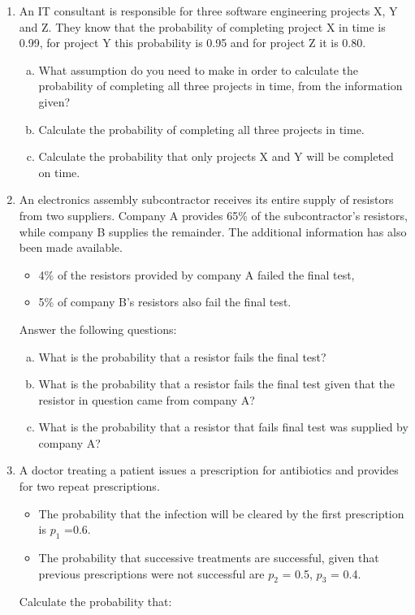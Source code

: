 \documentclass[a4paper,12pt]{article}
\begin{document}
\begin{enumerate}
\item An IT consultant is responsible for three software engineering projects X, Y and Z.
They know that the probability of completing project X in time is 0.99, for project Y this probability is 0.95
and for project Z it is 0.80.

\begin{enumerate}[(a)]
\item What assumption do you need to make in order to calculate the probability
of completing all three projects in time, from the information given?
\item Calculate the probability of completing all three projects in time.
\item Calculate the probability that only projects X and Y will be completed on time.
\end{enumerate}

    \item 
An electronics assembly subcontractor receives its entire supply of resistors from two suppliers. Company A provides 65\% of the subcontractor's resistors, while company B supplies the remainder. The additional information has also been made available.
\begin{itemize}
\item 4\% of the resistors provided by company A failed the final test,
\item 5\% of company B's resistors also fail the final test.
\end{itemize}
\noindent Answer the following questions:
\begin{enumerate}[(a)]
\item What is the probability that a resistor fails the final test?
\item  What is the probability that a resistor fails the final test given that the resistor in question came from company A?
\item  What is the probability that a resistor that fails final test was supplied by company A?
\end{enumerate}

\item A doctor treating a patient issues a prescription for antibiotics and provides for two repeat prescriptions. 
\begin{itemize}
    \item The probability that the infection will be cleared by the first prescription is $p_1$ =0.6.
\item The probability that successive treatments are successful, given that previous prescriptions were not successful are $p_2$ = 0.5, $p_3$ = 0.4.
\end{itemize} Calculate the probability that:


\end{enumerate}
\end{document}
